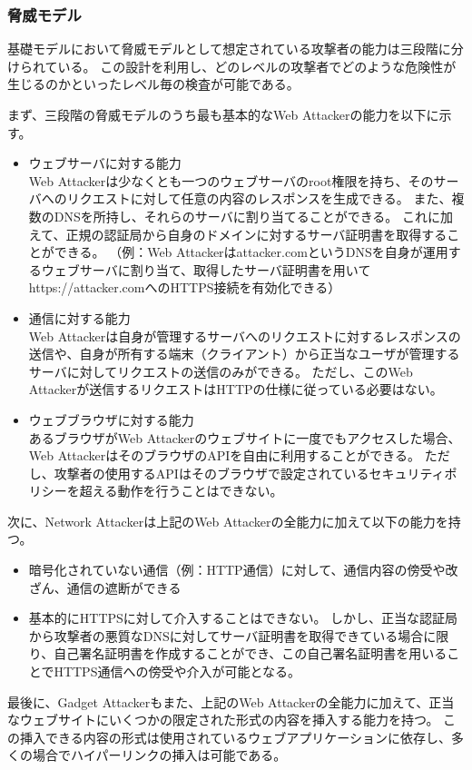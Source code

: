\documentclass[12pt,a4paper]{jbook}
\begin{document}
\subsubsection{脅威モデル}
基礎モデルにおいて脅威モデルとして想定されている攻撃者の能力は三段階に分けられている。
この設計を利用し、どのレベルの攻撃者でどのような危険性が生じるのかといったレベル毎の検査が可能である。

まず、三段階の脅威モデルのうち最も基本的なWeb Attackerの能力を以下に示す。
\begin{itemize}
\item ウェブサーバに対する能力 \\
Web Attackerは少なくとも一つのウェブサーバのroot権限を持ち、そのサーバへのリクエストに対して任意の内容のレスポンスを生成できる。
また、複数のDNSを所持し、それらのサーバに割り当てることができる。
これに加えて、正規の認証局から自身のドメインに対するサーバ証明書を取得することができる。
（例：Web Attackerはattacker.comというDNSを自身が運用するウェブサーバに割り当て、取得したサーバ証明書を用いてhttps://attacker.comへのHTTPS接続を有効化できる）
\item 通信に対する能力 \\
Web Attackerは自身が管理するサーバへのリクエストに対するレスポンスの送信や、自身が所有する端末（クライアント）から正当なユーザが管理するサーバに対してリクエストの送信のみができる。
ただし、このWeb Attackerが送信するリクエストはHTTPの仕様に従っている必要はない。
\item ウェブブラウザに対する能力 \\
あるブラウザがWeb Attackerのウェブサイトに一度でもアクセスした場合、Web AttackerはそのブラウザのAPIを自由に利用することができる。
ただし、攻撃者の使用するAPIはそのブラウザで設定されているセキュリティポリシーを超える動作を行うことはできない。
\end{itemize}

次に、Network Attackerは上記のWeb Attackerの全能力に加えて以下の能力を持つ。
\begin{itemize}
\item 暗号化されていない通信（例：HTTP通信）に対して、通信内容の傍受や改ざん、通信の遮断ができる
\item 基本的にHTTPSに対して介入することはできない。
しかし、正当な認証局から攻撃者の悪質なDNSに対してサーバ証明書を取得できている場合に限り、自己署名証明書を作成することができ、この自己署名証明書を用いることでHTTPS通信への傍受や介入が可能となる。
\end{itemize}

最後に、Gadget Attackerもまた、上記のWeb Attackerの全能力に加えて、正当なウェブサイトにいくつかの限定された形式の内容を挿入する能力を持つ。
この挿入できる内容の形式は使用されているウェブアプリケーションに依存し、多くの場合でハイパーリンクの挿入は可能である。
\end{document}
